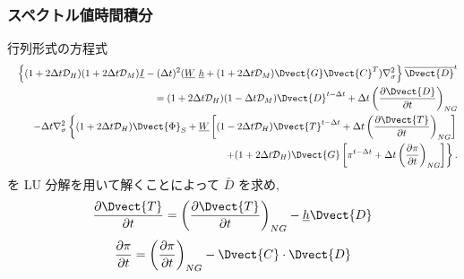 \subsubsection{スペクトル値時間積分}

行列形式の方程式
\begin{eqnarray}
&   &   \left\{ ( 1+2\Delta t {\cal D}_H )( 1+2\Delta t {\cal D}_M )
           \underline{I}  
      - ( \Delta t )^{2}  ( \underline{W} \ \underline{h} 
           + (1+2\Delta t {\cal D}_M)
             \Dvect{G} \Dvect{C}^{T} ) \nabla^{2}_{\sigma}
  \right\}
      \overline{ \Dvect{D} }^{t} 
      \nonumber \\
& & = ( 1+2\Delta t {\cal D}_H )( 1-\Delta t {\cal D}_M ) 
       \Dvect{D}^{t-\Delta t}
  + \Delta t 
         \left( \frac{\partial \Dvect{D}}{\partial t} \right)_{NG}  
 \nonumber \\
& & -  \Delta t \nabla^{2}_{\sigma}     
                   \left\{  ( 1+2\Delta t {\cal D}_H ) \Dvect{\Phi}_{S} 
                          + \underline{W} 
                            \left[ ( 1-2\Delta t {\cal D}_H ) 
                                    \Dvect{T}^{t-\Delta t}
                                  + \Delta t 
                                      \left( \frac{\partial \Dvect{T}}
                                                  {\partial t}     
                                      \right)_{NG} \right]
                   \right.
 \nonumber \\
  &  &             \left.  \hspace*{20mm} 
                          + ( 1+2\Delta t {\cal D}_H ) \Dvect{G} 
                            \left[ \pi^{t-\Delta t} 
                                  + \Delta t
                                     \left( \frac{\partial \pi}
                                                 {\partial t} 
                                     \right)_{NG}  \right]
                   \right\} . 
\end{eqnarray}
%
を LU 分解を用いて解くことによって 
$\bar{D}$ を求め,
%
\begin{equation}
  \frac{\partial \Dvect{T}}{\partial t} 
      =   \left( \frac{\partial \Dvect{T}}
                        {\partial t}       \right)_{NG}  
         - \underline{h} \Dvect{D}
\end{equation}
%
\begin{equation}
  \frac{\partial \pi}{\partial t} 
      =   \left( \frac{\partial \pi}
                        {\partial t}       \right)_{NG}  
         - \Dvect{C} \cdot \Dvect{D}
\end{equation}

